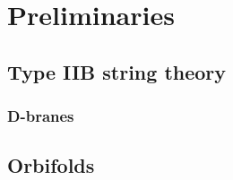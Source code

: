 

\chapter{Preliminaries}
\label{chap:data}
\pagestyle{fancy}

\section{Type IIB string theory}

\subsection{D-branes}

\section{Orbifolds}